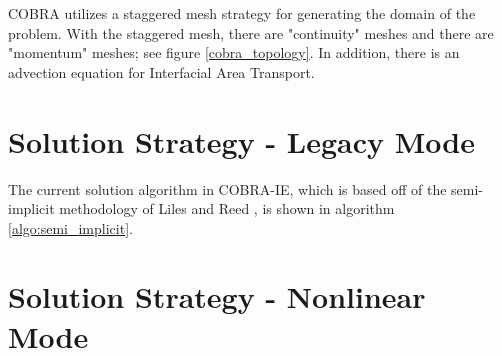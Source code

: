 COBRA utilizes a staggered mesh strategy for generating the domain of the problem. 
With the staggered mesh, there are "continuity" meshes and there are "momentum" meshes; see figure \ref{cobra_topology}.
In addition, there is an advection equation for Interfacial Area Transport. 

\section{Solution Strategy - Legacy Mode}
The current solution algorithm in COBRA-IE, which is based off of the semi-implicit methodology of Liles and Reed \cite{Liles1978}, is shown in algorithm \ref{algo:semi_implicit}.


\section{Solution Strategy - Nonlinear Mode}



